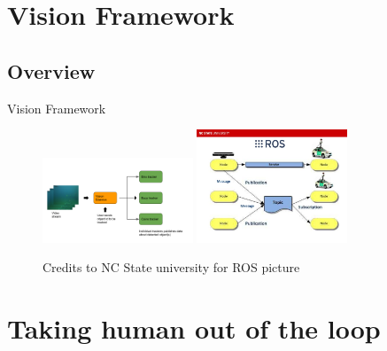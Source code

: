 \documentclass{beamer}
\begin{document}

\section{Vision Framework}

\subsection{Overview}
\begin{frame}{Vision Framework}
    \begin{figure}[ht]
        \centering
        \includegraphics[width=0.4\textwidth]{figs/overall_vision_architecture.png}\hspace{5em}
        \includegraphics[width=0.4\textwidth]{figs/ros_details.jpg}
        \caption{Credits to NC State university for ROS picture}
    \end{figure}    
\end{frame}



\section{Taking human out of the loop}
\end{document}
